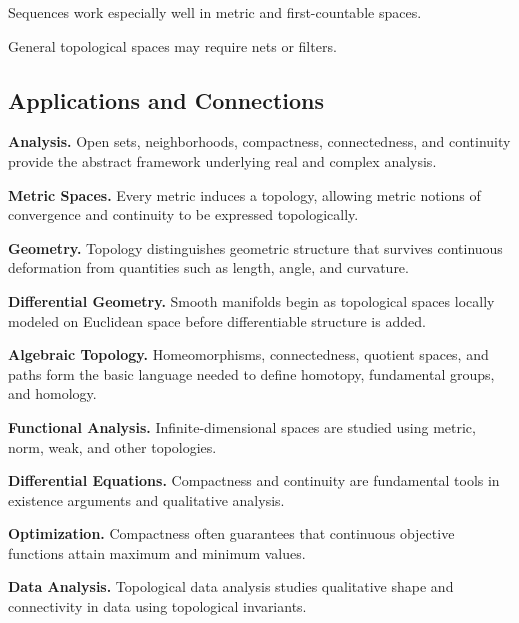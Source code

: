 Sequences work especially well in metric and first-countable spaces.

General topological spaces may require nets or filters.

\subsection{Applications and Connections}
\label{subsec:point-set-topology-applications}

\begin{applicationbox}
\textbf{Analysis.}
Open sets, neighborhoods, compactness, connectedness, and continuity provide
the abstract framework underlying real and complex analysis.

\medskip

\textbf{Metric Spaces.}
Every metric induces a topology, allowing metric notions of convergence and
continuity to be expressed topologically.

\medskip

\textbf{Geometry.}
Topology distinguishes geometric structure that survives continuous
deformation from quantities such as length, angle, and curvature.

\medskip

\textbf{Differential Geometry.}
Smooth manifolds begin as topological spaces locally modeled on Euclidean
space before differentiable structure is added.

\medskip

\textbf{Algebraic Topology.}
Homeomorphisms, connectedness, quotient spaces, and paths form the basic
language needed to define homotopy, fundamental groups, and homology.

\medskip

\textbf{Functional Analysis.}
Infinite-dimensional spaces are studied using metric, norm, weak, and other
topologies.

\medskip

\textbf{Differential Equations.}
Compactness and continuity are fundamental tools in existence arguments and
qualitative analysis.

\medskip

\textbf{Optimization.}
Compactness often guarantees that continuous objective functions attain
maximum and minimum values.

\medskip

\textbf{Data Analysis.}
Topological data analysis studies qualitative shape and connectivity in
data using topological invariants.
\end{applicationbox}

